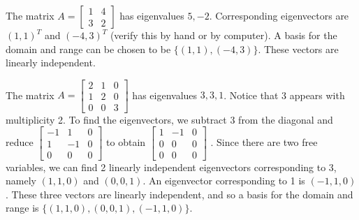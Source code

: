  
\begin{example}
The matrix 
$A=
\begin{bmatrix}
 1 & 4 \\
 3 & 2
\end{bmatrix}
$ has eigenvalues $5,-2$.  Corresponding eigenvectors are $(1,1)^T$ and $(-4,3)^T$ (verify this by hand or by computer). A basis for the domain and range can be chosen to be $\{(1,1),(-4,3)\}$. These vectors are linearly independent.
\end{example}
\begin{example}
The matrix 
$A=
\begin{bmatrix}
 2 & 1 & 0 \\
 1 & 2 & 0 \\
 0 & 0 & 3
\end{bmatrix}
$ has eigenvalues $3,3,1$. Notice that 3 appears with multiplicity 2.  To find the eigenvectors, we subtract 3 from the diagonal and reduce 
$
\begin{bmatrix}
 -1 & 1 & 0 \\
 1 & -1 & 0 \\
 0 & 0 & 0
\end{bmatrix}
$
to obtain
$
\begin{bmatrix}
 1 & -1 & 0 \\
 0 & 0 & 0 \\
 0 & 0 & 0
\end{bmatrix}
$
. Since there are two free variables, we can find 2 linearly independent eigenvectors corresponding to 3, namely $(1,1,0)$ and $(0,0,1)$. An eigenvector corresponding to 1 is $(-1,1,0)$. These three vectors are linearly independent, and so a basis for the domain and range is $\{ (1,1,0), (0,0,1), (-1,1,0) \}$.    
\end{example}
